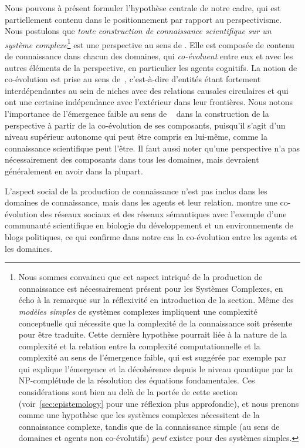 {Nous pouvons à présent formuler l'hypothèse centrale de notre cadre, qui est partiellement contenu dans le positionnement par rapport au perspectivisme. Nous postulons que \emph{toute construction de connaissance scientifique sur un système complexe}\footnote{Nous sommes convaincu que cet aspect intriqué de la production de connaissance est nécessairement présent pour les Systèmes Complexes, en écho à la remarque sur la réflexivité en introduction de la section. Même des \emph{modèles simples} de systèmes complexes impliquent une complexité conceptuelle qui nécessite que la complexité de la connaissance soit présente pour être traduite. Cette dernière hypothèse pourrait liée à la nature de la complexité et la relation entre la complexité computationnelle et la complexité au sens de l'émergence faible, qui est suggérée par exemple par~\cite{2014arXiv1403.7686B} qui explique l'émergence et la décohérence depuis le niveau quantique par la NP-complétude de la résolution des équations fondamentales. Ces considérations sont bien au delà de la portée de cette section (voir~\ref{sec:epistemology} pour une réflexion plus approfondie), et nous prenons comme une hypothèse que les systèmes complexes nécessitent de la connaissance complexe, tandis que de la connaissance simple (au sens de domaines et agents non co-évolutifs) \emph{peut} exister pour des systèmes simples.} est une perspective au sens de . Elle est composée de contenu de connaissance dans chacun des domaines, qui \emph{co-évoluent} entre eux et avec les autres éléments de la perspective, en particulier les agents cognitifs. La notion de co-évolution est prise au sens de~\cite{holland2012signals}, c'est-à-dire d'entités étant fortement interdépendantes au sein de niches avec des relations causales circulaires et qui ont une certaine indépendance avec l'extérieur dans leur frontières. Nous notons l'importance de l'émergence faible au sens de ~\cite{bedau2002downward} dans la construction de la perspective à partir de la co-évolution de ses composants, puisqu'il s'agit d'un niveau supérieur autonome qui peut être compris en lui-même, comme la connaissance scientifique peut l'être. Il faut aussi noter qu'une perspective n'a pas nécessairement des composants dans tous les domaines, mais devraient généralement en avoir dans la plupart.
}

L'aspect social de la production de connaissance n'est pas inclus dans les domaines de connaissance, mais dans les agents et leur relation. \cite{roth2010social} montre une co-évolution des réseaux sociaux et des réseaux sémantiques avec l'exemple d'une communauté scientifique en biologie du développement et un environnements de blogs politiques, ce qui confirme dans notre cas la co-évolution entre les agents et les domaines.





